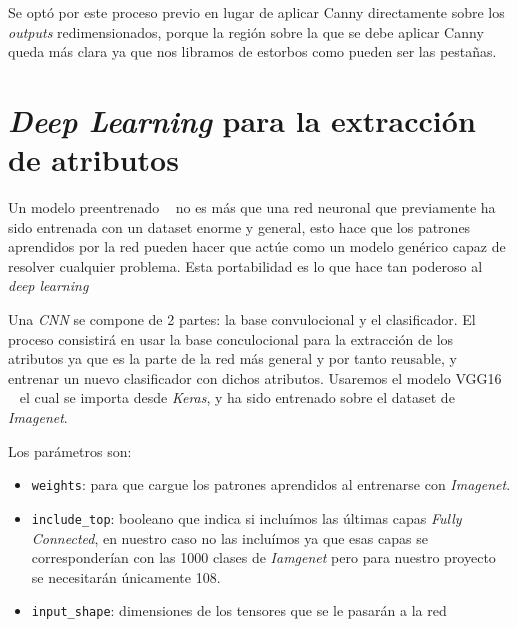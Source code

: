 

Se optó por este proceso previo en lugar de aplicar Canny directamente sobre los \emph{outputs} redimensionados, porque la región sobre la que se debe aplicar Canny queda más clara ya que nos libramos de estorbos como pueden ser las pestañas.

\section{\emph{Deep Learning} para la extracción de atributos}

Un modelo preentrenado ~\cite{chollet:2017} no es más que una red neuronal que previamente ha sido entrenada con un dataset enorme y general, esto hace que los patrones aprendidos por la red pueden hacer que actúe como un modelo genérico capaz de resolver cualquier problema.
Esta portabilidad es lo que hace tan poderoso al \emph{deep learning}

Una \emph{CNN} se compone de 2 partes: la base convulocional y el clasificador. El proceso consistirá en usar la base conculocional para la extracción de los atributos ya que es la parte de la red más general y por tanto reusable, y entrenar un nuevo clasificador con dichos atributos.
Usaremos el modelo VGG16 ~\cite{simonyan:2014} el cual se importa desde \emph{Keras}, y ha sido entrenado sobre el dataset de \emph{Imagenet}.


Los parámetros son:
\begin{itemize}
    \item \texttt{weights}: para que cargue los patrones aprendidos al entrenarse con \emph{Imagenet}.
    \item\texttt{include\_top}: booleano que indica si incluímos las últimas capas \emph{Fully Connected}, en nuestro caso no las incluímos ya que esas capas se corresponderían con las 1000 clases de \emph{Iamgenet} pero para nuestro proyecto se necesitarán únicamente 108.
    \item\texttt{input\_shape}: dimensiones de los tensores que se le pasarán a la red
\end{itemize}


